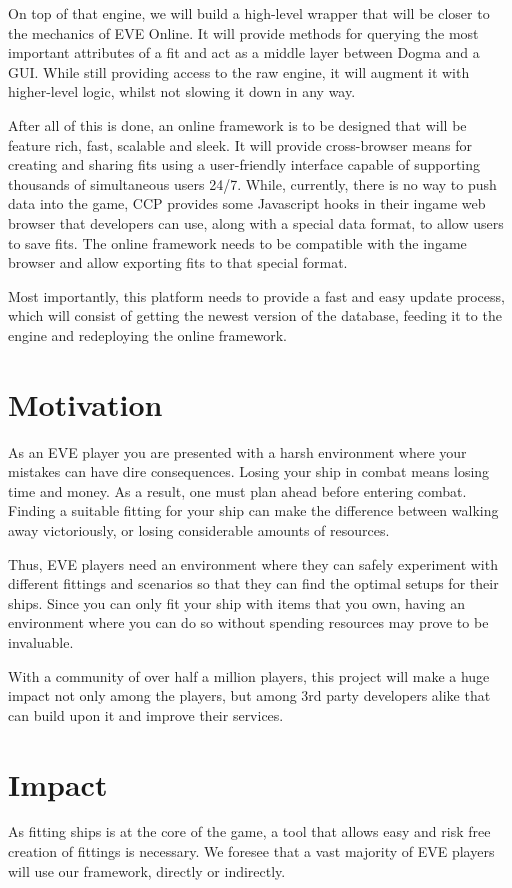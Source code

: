 On top of that engine, we will build a high-level wrapper that will be closer to the mechanics of EVE Online. It will provide methods for querying the most important attributes of a fit and act as a middle layer between Dogma and a GUI. While still providing access to the raw engine, it will augment it with higher-level logic, whilst not slowing it down in any way.

After all of this is done, an online framework is to be designed that will be feature rich, fast, scalable and sleek. It will provide cross-browser means for creating and sharing fits using a user-friendly interface capable of supporting thousands of simultaneous users 24/7. While, currently, there is no way to push data into the game, CCP provides some Javascript hooks in their ingame web browser that developers can use, along with a special data format, to allow users to save fits. The online framework needs to be compatible with the ingame browser and allow exporting fits to that special format.

Most importantly, this platform needs to provide a fast and easy update process, which will consist of getting the newest version of the database, feeding it to the engine and redeploying the online framework.

\section{Motivation}
As an EVE player you are presented with a harsh environment where your mistakes can have dire consequences. Losing your ship in combat means losing time and money. As a result, one must plan ahead before entering combat. Finding a suitable fitting for your ship can make the difference between walking away victoriously, or losing considerable amounts of resources.

Thus, EVE players need an environment where they can safely experiment with different fittings and scenarios so that they can find the optimal setups for their ships. Since you can only fit your ship with items that you own, having an environment where you can do so without spending resources may prove to be invaluable.

With a community of over half a million players, this project will make a huge impact not only among the players, but among 3rd party developers alike that can build upon it and improve their services.

\section{Impact}
As fitting ships is at the core of the game, a tool that allows easy and risk free creation of fittings is necessary. We foresee that a vast majority of EVE players will use our framework, directly or indirectly. 

